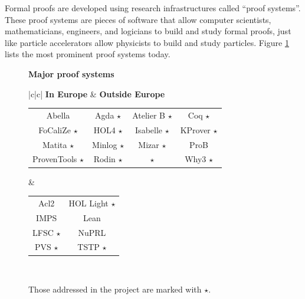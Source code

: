 Formal proofs are developed using research infrastructures called
``proof systems''.  These proof systems are pieces of software that
allow computer scientists, mathematicians, engineers, and logicians to
build and study formal proofs, just like particle accelerators allow
physicists to build and study particles. Figure \ref{systems} lists
the most prominent proof systems today.

\newcommand\s{ $\star$}
\begin{figure}[ht]
  \begin{shaded}
    \begin{center}
      {\bf \Large Major proof systems}\\[5mm]
      \begin{tabular}{|c|c|}\hline
       {\bf In Europe} & {\bf Outside Europe}\\\hline
        \begin{minipage}{10cm}
          \begin{tabular}{cccc}
            Abella & Agda\s & Atelier B\s & Coq\s\\
            FoCaliZe\s & HOL4\s & Isabelle\s & KProver\s\\
            Matita\s & Minlog\s & Mizar\s & ProB\\
            ProvenTools\s & Rodin\s & \tlaplus\s & Why3\s\\
          \end{tabular}
        \end{minipage}
        &\begin{minipage}{4cm}
           \begin{tabular}{cc}
             Acl2 & HOL Light\s\\
             IMPS & Lean\\
             LFSC\s & NuPRL\\
             PVS\s & TSTP\s
           \end{tabular}
         \end{minipage}\\\hline
      \end{tabular}
    \end{center}
    \vspace{-5mm}
    \caption{Those addressed in the project are marked with $\star$.\label{systems}}
  \end{shaded}
\end{figure}


